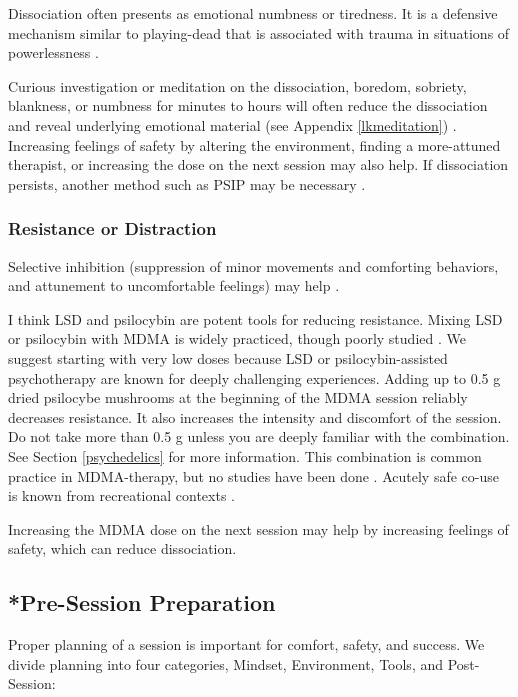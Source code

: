 \documentclass[12pt,letterpaper]{article}
\begin{document}
Dissociation often presents as emotional numbness or tiredness. It is a defensive mechanism similar to playing-dead that is associated with trauma in situations of powerlessness \cite{loewensteinDissociation}.

Curious investigation or meditation on the dissociation, boredom, sobriety, blankness, or numbness for minutes to hours will often reduce the dissociation and reveal underlying emotional material (see Appendix \ref{lkmeditation}) \cite{razviPSIP}.  Increasing feelings of safety by altering the environment, finding a more-attuned therapist, or increasing the dose on the next session may also help. If dissociation persists, another method such as PSIP may be necessary \cite{razviPSIP}.
\subsubsection{Resistance or Distraction}
Selective inhibition (suppression of minor movements and comforting behaviors, and attunement to uncomfortable feelings) may help \cite{razviPSIP}.

 

I think LSD and psilocybin are potent tools for reducing resistance.  Mixing LSD or psilocybin with MDMA is widely practiced, though poorly studied \cite{zeifmanCo-use}. We suggest starting with very low doses because LSD or psilocybin-assisted psychotherapy are known for deeply challenging experiences. Adding up to 0.5 g dried psilocybe mushrooms at the beginning of the MDMA session reliably decreases resistance. It also increases the intensity and discomfort of the session. Do not take more than 0.5 g unless you are deeply familiar with the combination. See Section \ref{psychedelics} for more information. This combination is common practice in MDMA-therapy, but no studies have been done \cite{colemanPsychedelicPsychotherapy}. Acutely safe co-use is known from recreational contexts \cite{zeifmanCo-use}. 

Increasing the MDMA dose on the next session may help by increasing feelings of safety, which can reduce dissociation.
\subsection{*Pre-Session Preparation}
\label{prep}
Proper planning of a session is important for comfort, safety, and success. We divide planning into four categories, Mindset, Environment, Tools, and Post-Session:
\end{document}
